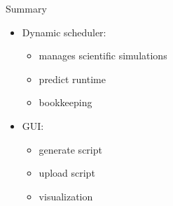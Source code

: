 \begin{frame}{Summary}
	\begin{itemize}
		\pause
		\item Dynamic scheduler:
		\begin{itemize}
			\pause
			\item manages scientific simulations
			\pause
			\item predict runtime
			\pause
			\item bookkeeping
		\end{itemize}
		\pause
		\item GUI:
		\begin{itemize}
			\pause
			\item generate script
			\pause
			\item upload script
			\pause
			\item visualization
		\end{itemize}
	\end{itemize}
\end{frame}
